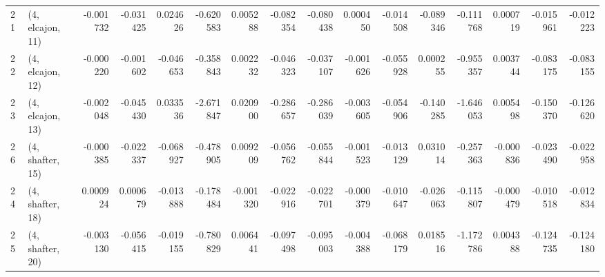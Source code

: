 \begin{tabular}{llrrrrrrrrrrrrrr}
21 &  (4, elcajon, 11) &  -0.001732 & -0.031425 &  0.024626 &  -0.620583 &  0.005288 &  -0.082354 & -0.080438 &  0.000450 & -0.014508 & -0.089346 &  -0.111768 &  0.000719 & -0.015961 & -0.012223 \\
22 &  (4, elcajon, 12) &  -0.000220 & -0.001602 & -0.046653 &  -0.358843 &  0.002232 &  -0.046323 & -0.037107 & -0.001626 & -0.055928 &  0.000255 &  -0.955357 &  0.003744 & -0.083175 & -0.083155 \\
23 &  (4, elcajon, 13) &  -0.002048 & -0.045430 &  0.033536 &  -2.671847 &  0.020900 &  -0.286657 & -0.286039 & -0.003605 & -0.054906 & -0.140285 &  -1.646053 &  0.005498 & -0.150370 & -0.126620 \\
26 &  (4, shafter, 15) &  -0.000385 & -0.022337 & -0.068927 &  -0.478905 &  0.009209 &  -0.056762 & -0.055844 & -0.001523 & -0.013129 &  0.031014 &  -0.257363 & -0.000836 & -0.023490 & -0.022958 \\
24 &  (4, shafter, 18) &   0.000924 &  0.000679 & -0.013888 &  -0.178484 & -0.001320 &  -0.022916 & -0.022701 & -0.000379 & -0.010647 & -0.026063 &  -0.115807 & -0.000479 & -0.010518 & -0.012834 \\
25 &  (4, shafter, 20) &  -0.003130 & -0.056415 & -0.019155 &  -0.780829 &  0.006441 &  -0.097498 & -0.095003 & -0.004388 & -0.068179 &  0.018516 &  -1.172786 &  0.004388 & -0.124735 & -0.124180 \\
\bottomrule
\end{tabular}
